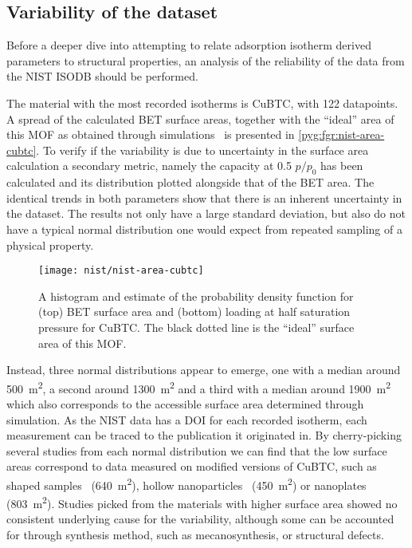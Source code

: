 \subsection{Variability of the dataset}

Before a deeper dive into attempting to relate adsorption isotherm
derived parameters to structural properties, an analysis of the 
reliability of the data from the NIST ISODB should be performed.

The material with the most recorded isotherms is CuBTC, with 
122 datapoints. A spread of the calculated BET surface areas,
together with the ``ideal'' area of this MOF as obtained
through simulations~\cite{parkHowReproducibleAre2017} is 
presented in \autoref{pyg:fgr:nist-area-cubtc}.
To verify if the variability is due to uncertainty in the 
surface area calculation a secondary metric, namely the 
capacity at 0.5 \(p/p_0\) has been calculated and its 
distribution plotted alongside that of the BET area. The
identical trends in both parameters show that there is an
inherent uncertainty in the dataset. The results not only 
have a large standard deviation, but also do not have a 
typical normal distribution one would expect from repeated
sampling of a physical property.

\begin{wrapfigure}{h}{0.5\textwidth}
    \centering
    \captionsetup{format=plain}
    \texttt{[image: nist/nist-area-cubtc]}%
    \caption{A histogram and estimate of the probability density 
    function for (top) BET surface area and (bottom) loading
    at half saturation pressure for CuBTC. The black dotted line
    is the ``ideal'' surface area of this MOF.}%
    \label{pyg:fgr:nist-area-cubtc}
\end{wrapfigure}

Instead, three normal distributions appear to emerge, one with a
median around \SI{500}{\metre^2}, a second around \SI{1300}{\metre^2}
and a third with a median around \SI{1900}{\metre^2} which also
corresponds to the accessible surface area determined through
simulation. As the NIST data has a DOI for each recorded isotherm, each
measurement can be traced to the publication it originated in.
By cherry-picking several studies from each normal distribution
we can find that the low surface areas correspond to data 
measured on modified versions of CuBTC, such as shaped 
samples~\cite{liSeparationCO2CH42014} (\SI{640}{\metre^2}), hollow 
nanoparticles~\cite{liControllableSynthesisMetal2013} (\SI{450}{\metre^2})
or nanoplates~\cite{pengSurfactantdirectedAssemblyMesoporous2012}
(\SI{803}{\metre^2}).
Studies picked from the materials with higher surface area 
showed no consistent underlying cause for the variability,
although some can be accounted for through synthesis method,
such as mecanosynthesis, or structural defects.


